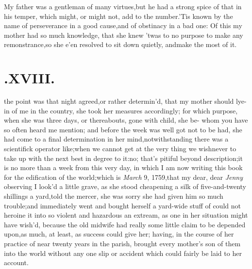 \documentclass{article}
\begin{document}
My father was a gentleman of many virtues,\tsk  but he had a
strong spice of that in his temper, which might, or might not, add
to the number.\tsk  ’Tis known by the name of perseverance
in a good cause,\tsk  and of obstinacy in a bad one: Of this my
mother had so much know\-ledge, that she knew ’twas to no
purpose to make any remonstrance,\tsk  so she e’en resolved
to sit down quietly, and\break make the most of it.

\null
\section{.\enspace XVIII.}

 the point was that night agreed,\break or rather
determin’d, that my mo\-ther should lye-in of me in the country, she
took her measures accordingly; for which purpose, when she was
three days, or thereabouts, gone with child, she be-
whom you have so often heard me mention; and
before the week was well got 
not to be had, she had come to a final
determination in her mind,\tsh  notwith\-standing there was a scientifick \hbox{operator} 
like;\tsh  when we cannot get at the very thing we
wish\tsh  never to take up with the next best in degree to
it:\tsk  no; that’s pitiful beyond description;\tsk  it is
no more than a week from this very day, in which I am now writing
this book for the edification of the world;\tsk  which is
\textit{March} 9, 1759,\tsh  that my dear, dear \textit{Jenny}
observing I look’d a little grave, as she stood cheapening a silk
of five-and-twenty shillings a yard,\tsk  told the mercer, she was sorry she had given him so
much trouble;\tsk  and immediately went and bought herself a
yard-wide stuff of 
could not heroine it into so violent and hazardous an
extream, as one in her situation might have wish’d, because the
old midwife had really some little claim to be depended upon,\tsk  as
much, at least, as success could give her; having, in the course of
her practice of near twenty years in the parish, brought every
mother’s son of them into the world without any one slip or
accident which could fairly be laid to her account.
\end{document}
